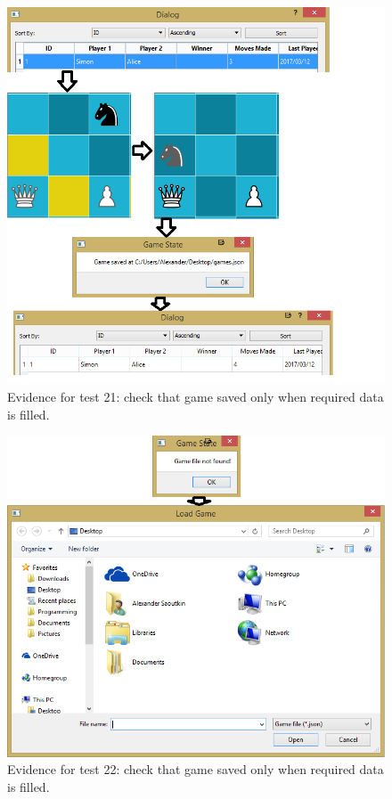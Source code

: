\begin{figure}
	\centering
	\includegraphics[width=1.0\textwidth]{images/screenshots/test-21}
	\caption{Evidence for test 21: check that game saved only when required data is filled.}
	\label{test-21}
\end{figure}
\begin{figure}
	\centering
	\includegraphics[width=1.0\textwidth]{images/screenshots/test-22}
	\caption{Evidence for test 22: check that game saved only when required data is filled.}
	\label{test-22}
\end{figure}
